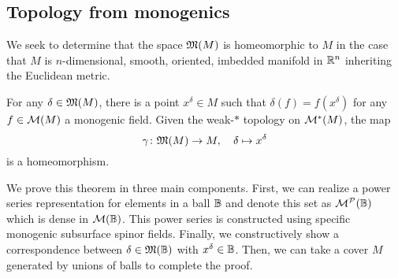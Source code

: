 \subsection{Topology from monogenics}

We seek to determine that the space $\mathfrak{M}(M)$ is homeomorphic to $M$ in the case that $M$ is $n$-dimensional, smooth, oriented, imbedded manifold in $\mathbb{R}^n$ inheriting the Euclidean metric. 

\begin{theorem}
\label{thm:gelfand}
For any $\delta \in \mathfrak{M}(M)$, there is a point $x^\delta \in M$ such that $\delta(f) = f(x^\delta)$ for any $f\in \mathcal{M}(M)$ a monogenic field. Given the weak-$\ast$ topology on $\mathcal{M}^*(M)$, the map
\[
\gamma \colon \mathfrak{M}(M) \to M, \quad \delta \mapsto x^\delta
\]
is a homeomorphism.  
\end{theorem}

We prove this theorem in three main components. First, we can realize a power series representation for elements in a ball $\mathbb{B}$ and denote this set as $\mathcal{M}^\mathcal{P}(\mathbb{B})$ which is dense in $\mathcal{M}(\mathbb{B})$. This power series is constructed using specific monogenic subsurface spinor fields. Finally, we constructively show a correspondence between $\delta \in \mathfrak{M}(\mathbb{B})$ with $x^\delta \in \mathbb{B}$. Then, we can take a cover $M$ generated by unions of balls to complete the proof.

